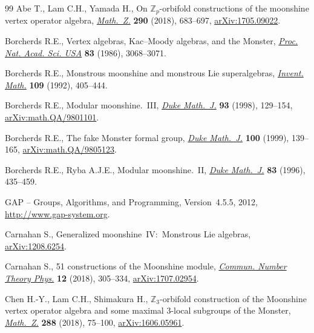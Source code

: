 \documentclass[11pt]{article}
\theoremstyle{definition}
\begin{document}
\begin{thebibliography}{99}
Abe T., Lam C.H., Yamada H., On {${\mathbb Z}_p$}-orbifold constructions of the
 moonshine vertex operator algebra, \href{https://doi.org/10.1007/s00209-017-2036-3}{\textit{Math.~Z.}} \textbf{290} (2018),
 683--697, \href{https://arxiv.org/abs/1705.09022}{arXiv:1705.09022}.

Borcherds R.E., Vertex algebras, {K}ac--{M}oody algebras, and the {M}onster,
 \href{https://doi.org/10.1073/pnas.83.10.3068}{\textit{Proc. Nat. Acad. Sci. USA}} \textbf{83} (1986), 3068--3071.

Borcherds R.E., Monstrous moonshine and monstrous {L}ie superalgebras,
 \href{https://doi.org/10.1007/BF01232032}{\textit{Invent. Math.}} \textbf{109} (1992), 405--444.

Borcherds R.E., Modular moonshine.~{III}, \href{https://doi.org/10.1215/S0012-7094-98-09305-X}{\textit{Duke Math.~J.}} \textbf{93}
 (1998), 129--154, \href{https://arxiv.org/abs/math.QA/9801101}{arXiv:math.QA/9801101}.

Borcherds R.E., The fake {M}onster formal group, \href{https://doi.org/10.1215/S0012-7094-99-10005-6}{\textit{Duke Math.~J.}}
 \textbf{100} (1999), 139--165, \href{https://arxiv.org/abs/math.QA/9805123}{arXiv:math.QA/9805123}.

Borcherds R.E., Ryba A.J.E., Modular moonshine.~{II}, \href{https://doi.org/10.1215/S0012-7094-96-08315-5}{\textit{Duke Math.~J.}}
 \textbf{83} (1996), 435--459.

GAP -- Groups, Algorithms, and Programming, {V}ersion~4.5.5, 2012,
 \url{http://www.gap-system.org}.

Carnahan S., Generalized moonshine~{IV}:~{M}onstrous {L}ie algebras,
 \href{https://arxiv.org/abs/1208.6254}{arXiv:1208.6254}.

Carnahan S., 51 constructions of the {M}oonshine module, \href{https://doi.org/10.4310/cntp.2018.v12.n2.a3}{\textit{Commun. Number
 Theory Phys.}} \textbf{12} (2018), 305--334, \href{https://arxiv.org/abs/1707.02954}{arXiv:1707.02954}.

Chen H.-Y., Lam C.H., Shimakura H., {${\mathbb Z}_3$}-orbifold construction of
 the {M}oonshine vertex operator algebra and some maximal 3-local subgroups of
 the {M}onster, \href{https://doi.org/10.1007/s00209-017-1878-z}{\textit{Math.~Z.}} \textbf{288} (2018), 75--100,
 \href{https://arxiv.org/abs/1606.05961}{arXiv:1606.05961}.


\end{thebibliography}
\end{document}
